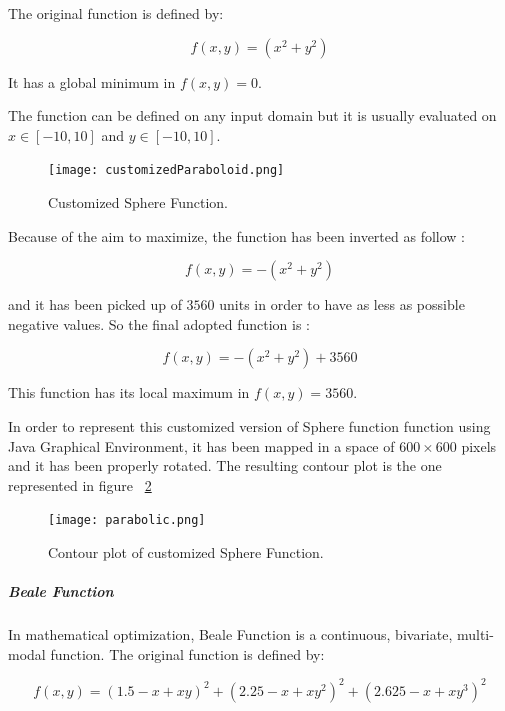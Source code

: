 The original function is defined by: 

\begin{equation}
f(x, y) = (x^2 + y^2) 
\end{equation}

It has a global minimum in $f(x, y) = 0$.

The function can be defined on any input domain but it is usually evaluated on $x \in [-10, 10]$ and $y \in [-10, 10]$. 

\begin{figure}[h!]
	\centering
	\texttt{[image: customizedParaboloid.png]}
	\caption{Customized Sphere Function.}
	\label{fig:CustomizedParaboloidOfRevolution}
\end{figure}

Because of the aim to maximize, the function has been inverted as follow :

\begin{equation}
f(x, y) = -(x^2 + y^2)
\end{equation}

and it has been picked up of $3560$ units in order to have as less as possible negative values. So the final adopted function is :

\begin{equation}
f(x, y) = -(x^2 + y^2) + 3560
\end{equation}

This function has its local maximum in $f(x, y) = 3560$.

In order to represent this customized version of Sphere function function using Java Graphical Environment, it has been mapped in a space of $600 \times 600$ pixels and it has been properly rotated. The resulting contour plot is the one represented in figure ~\ref{fig:ContourPlotCustomizedParabolicFunction} 

\begin{figure}[h!]
	\centering
	\texttt{[image: parabolic.png]}
	\caption{Contour plot of customized Sphere Function.}
	\label{fig:ContourPlotCustomizedParabolicFunction}
\end{figure}

\subparagraph{Beale Function} In mathematical optimization, Beale Function is a continuous, bivariate, multi-modal function. The original function is defined by: 

\begin{equation}
f(x, y) = (1.5 - x + xy)^2 + (2.25 - x + xy^2)^2 + (2.625 - x + xy^3)^2
\end{equation}

